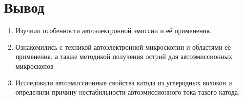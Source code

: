 \documentclass[a4paper, 12pt]{article}
\begin{document}
	\section{Вывод}
	\begin{enumerate}
		\item Изучили особенности автоэлектронной эмиссии и её применения.
		\item Ознакомились с техникой автоэлектронной микроскопии и областями её применения, а также методикой получения острий для автоэмиссионных микроскопов
		\item Исследовали автоэмиссионные свойства катода из углеродных волокон и определили причину нестабильности автоэмиссионного тока такого катода.
	\end{enumerate}
\end{document}
